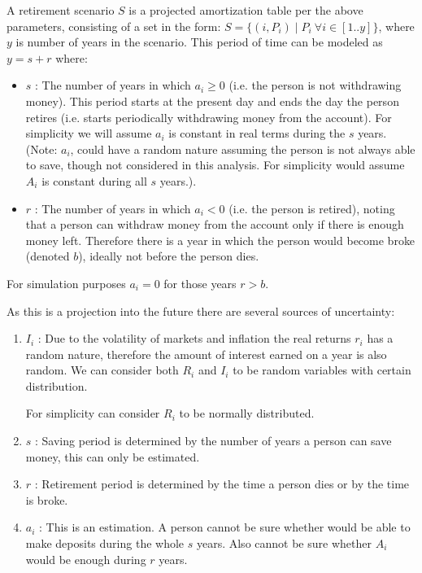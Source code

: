 \documentclass[8pt]{article}
\begin{document}
A retirement scenario $S$ is a projected amortization table per the above parameters, consisting of a set in the form: $S= \{ (i,P_i) \mid  P_i ~ \forall i \in [1..y] \}$, where $y$ is number of years in the scenario.  This period of time can be modeled as $y=s+r$ where:
\begin{itemize}
\item $s$ : The number of years in which $a_i \geq 0$ (i.e. the person is not withdrawing money).  This period starts at the present day and ends the day the person retires (i.e. starts periodically withdrawing money from the account).  For simplicity we will assume $a_i$ is constant in real terms during the $s$ years. \\
(Note: $a_i$, could have a random nature assuming the person is not always able to save, though not considered in this analysis.  For simplicity would assume $A_i$ is constant during all $s$ years.).
\item $r$ : The number of years in which $a_i < 0$ (i.e. the person is retired), noting that a person can withdraw money from the account only if there is enough money left.  Therefore there is a year in which the person would become broke (denoted $b$), ideally not before the person dies.  

\end{itemize}

For simulation purposes $a_i=0$ for those years $r>b$.


As this is a projection into the future there are several sources of uncertainty:

\begin{enumerate}
\item $I_i$ : Due to the volatility of markets and inflation the real returns $r_i$ has a random nature, therefore the amount of interest earned on a year is also random.  We can consider both $R_i$ and $I_i$ to be random variables with certain distribution.  

For simplicity can consider $R_i$ to be normally distributed.

\item $s$ : Saving period is determined by the number of years a person can save money, this can only be estimated.

\item $r$ : Retirement period is determined by the time a person dies or by the time is broke.

\item $a_i$ : This is an estimation.  A person cannot be sure whether would be able to make deposits during the whole $s$ years.  Also cannot be sure whether $A_i$ would be enough during $r$ years.
\end{enumerate}
\end{document}
